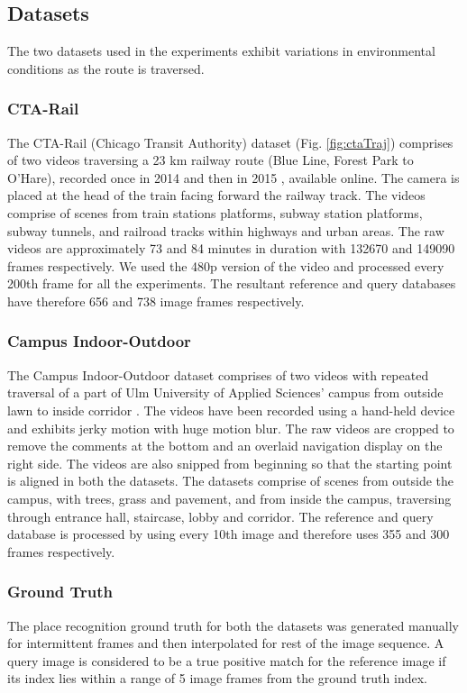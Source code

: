 \documentclass[letterpaper, 10 pt, conference]{ieeeconf}  %
\begin{document}
\subsection{Datasets}
The two datasets used in the experiments exhibit variations in environmental conditions as the route is traversed.

\subsubsection{CTA-Rail}
The CTA-Rail (Chicago Transit Authority) dataset (Fig. \ref{fig:ctaTraj}) comprises of two videos traversing a 23 km railway route (Blue Line, Forest Park to O'Hare), recorded once in 2014 \cite{ctaRail2014} and then in 2015 \cite{ctaRail2015}, available online. The camera is placed at the head of the train facing forward the railway track. The videos comprise of scenes from train stations platforms, subway station platforms, subway tunnels, and railroad tracks within highways and urban areas. The raw videos are approximately 73 and 84 minutes in duration with 132670 and 149090 frames respectively. We used the 480p version of the video and processed every 200th frame for all the experiments. The resultant reference and query databases have therefore 656 and 738 image frames respectively.

\subsubsection{Campus Indoor-Outdoor}
The Campus Indoor-Outdoor dataset comprises of two videos with repeated traversal of a part of Ulm University of Applied Sciences' campus from outside lawn to inside corridor \cite{indoorOutdoor1,indoorOutdoor2}. The videos have been recorded using a hand-held device and exhibits jerky motion with huge motion blur. The raw videos are cropped to remove the comments at the bottom and an overlaid navigation display on the right side. The videos are also snipped from beginning so that the starting point is aligned in both the datasets. The datasets comprise of scenes from outside the campus, with trees, grass and pavement, and from inside the campus, traversing through entrance hall, staircase, lobby and corridor. The reference and query database is processed by using every 10th image and therefore uses 355 and 300 frames respectively.

\subsubsection{Ground Truth}
The place recognition ground truth for both the datasets was generated manually for intermittent frames and then interpolated for rest of the image sequence. A query image is considered to be a true positive match for the reference image if its index lies within a range of 5 image frames from the ground truth index.
\end{document}
